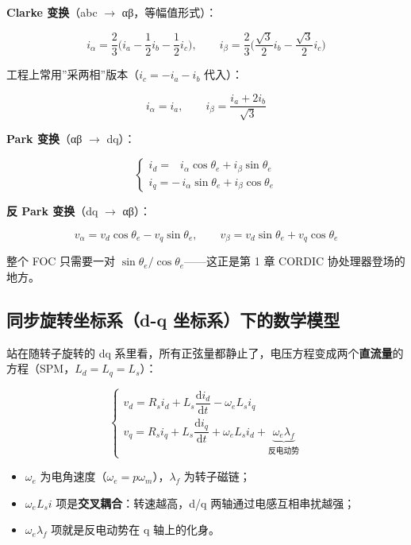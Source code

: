 \documentclass[
  UTF8,
  scheme=plain,
  fontsize=10pt,
  openany
]{ctexbook}
\begin{document}
\textbf{Clarke 变换}（abc \(\rightarrow\) αβ，等幅值形式）：

\[i_\alpha = \frac{2}{3}\Big(i_a - \frac{1}{2} i_b - \frac{1}{2} i_c\Big), \qquad i_\beta = \frac{2}{3}\Big(\frac{\sqrt{3}}{2} i_b - \frac{\sqrt{3}}{2} i_c\Big)\]

工程上常用''采两相''版本（\(i_c = -i_a - i_b\) 代入）：

\[i_\alpha = i_a, \qquad i_\beta = \frac{i_a + 2 i_b}{\sqrt{3}}\]

\textbf{Park 变换}（αβ \(\rightarrow\) dq）：

\[\begin{cases} i_d = \;\;\, i_\alpha \cos\theta_e + i_\beta \sin\theta_e \\ i_q = -\, i_\alpha \sin\theta_e + i_\beta \cos\theta_e \end{cases}\]

\textbf{反 Park 变换}（dq \(\rightarrow\) αβ）：

\[v_\alpha = v_d \cos\theta_e - v_q \sin\theta_e, \qquad v_\beta = v_d \sin\theta_e + v_q \cos\theta_e\]

整个 FOC 只需要一对 \(\sin\theta_e / \cos\theta_e\)------这正是第 1 章
CORDIC 协处理器登场的地方。

\subsection{同步旋转坐标系（d-q
坐标系）下的数学模型}\label{ux540cux6b65ux65cbux8f6cux5750ux6807ux7cfbd-q-ux5750ux6807ux7cfbux4e0bux7684ux6570ux5b66ux6a21ux578b}

站在随转子旋转的 dq
系里看，所有正弦量都静止了，电压方程变成两个\textbf{直流量}的方程（SPM，\(L_d = L_q = L_s\)）：

\[\begin{cases} v_d = R_s i_d + L_s \dfrac{\mathrm{d}i_d}{\mathrm{d}t} - \omega_e L_s i_q \\[6pt] v_q = R_s i_q + L_s \dfrac{\mathrm{d}i_q}{\mathrm{d}t} + \omega_e L_s i_d + \underbrace{\omega_e \lambda_f}_{\text{反电动势}} \end{cases}\]

\begin{itemize}
\tightlist
\item
  \(\omega_e\) 为电角速度（\(\omega_e = p \omega_m\)），\(\lambda_f\)
  为转子磁链；
\item
  \(\omega_e L_s i\) 项是\textbf{交叉耦合}：转速越高，d/q
  两轴通过电感互相串扰越强；
\item
  \(\omega_e \lambda_f\) 项就是反电动势在 q 轴上的化身。
\end{itemize}
\end{document}
